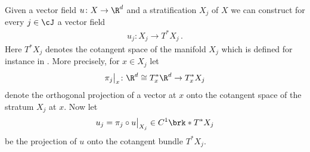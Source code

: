 Given a vector field $u\colon X\to\R^d$ and a stratification $X_j$ of $X$ we can construct for every
$j\in\cJ$ a vector field
\begin{align*}
  u_j\colon X_j\to T^*X_j\,.
\end{align*}
Here $T^*X_j$ denotes the cotangent space of the manifold $X_j$ which is defined for instance in \cite[Chapter 6]{Hirsch1994}.
More precisely, for $x\in X_j$ let
\begin{align}
  \pi_j\big\vert_x\colon\R^d\cong T_x^*\R^d\to T_x^*X_{j}\label{eq:def_projectionStratification}
\end{align}
denote the orthogonal projection of a vector at $x$ onto the cotangent space of the stratum $X_j$ at $x$.
Now let
\begin{align}
  u_j=\pi_j\circ u\big\vert_{X_j}\in C^1\brk*{T^*X_j}\label{eq:def_projectionUStratification}
\end{align}
be the projection of $u$ onto the cotangent bundle $T^*X_j$.


